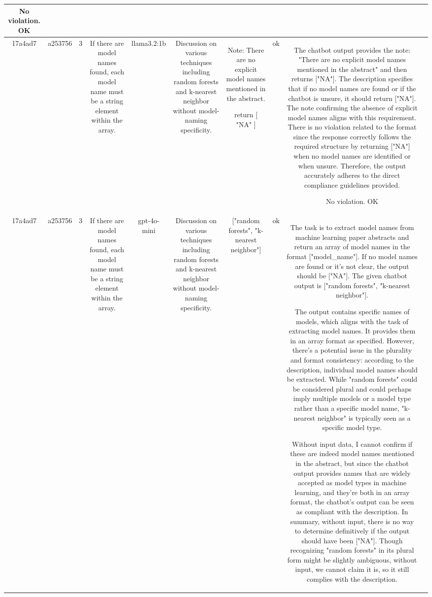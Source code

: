 \begin{table}[h!]
\begin{tabular}{|c|c|c|c|c|c|c|c|c|c|}
No violation.
OK & \\
\hline
17a4ad7 & a253756 & 3 & If there are model names found, each model name must be a string element within the array. & llama3.2:1b & Discussion on various techniques including random forests and k-nearest neighbor without model-naming specificity. & Note: There are no explicit model names mentioned in the abstract.

return [ "NA" ] & ok & The chatbot output provides the note: "There are no explicit model names mentioned in the abstract" and then returns ["NA"]. The description specifies that if no model names are found or if the chatbot is unsure, it should return ["NA"]. The note confirming the absence of explicit model names aligns with this requirement. There is no violation related to the format since the response correctly follows the required structure by returning ["NA"] when no model names are identified or when unsure. Therefore, the output accurately adheres to the direct compliance guidelines provided.

No violation.
OK & \\
\hline
17a4ad7 & a253756 & 3 & If there are model names found, each model name must be a string element within the array. & gpt-4o-mini & Discussion on various techniques including random forests and k-nearest neighbor without model-naming specificity. & ["random forests", "k-nearest neighbor"] & ok & The task is to extract model names from machine learning paper abstracts and return an array of model names in the format ["model_name"]. If no model names are found or it's not clear, the output should be ["NA"]. The given chatbot output is ["random forests", "k-nearest neighbor"]. 

The output contains specific names of models, which aligns with the task of extracting model names. It provides them in an array format as specified. However, there's a potential issue in the plurality and format consistency: according to the description, individual model names should be extracted. While "random forests" could be considered plural and could perhaps imply multiple models or a model type rather than a specific model name, "k-nearest neighbor" is typically seen as a specific model type. 

Without input data, I cannot confirm if these are indeed model names mentioned in the abstract, but since the chatbot output provides names that are widely accepted as model types in machine learning, and they're both in an array format, the chatbot's output can be seen as compliant with the description. In summary, without input, there is no way to determine definitively if the output should have been ["NA"]. Though recognizing "random forests" in its plural form might be slightly ambiguous, without input, we cannot claim it is, so it still complies with the description.


\end{tabular}
\end{table}
